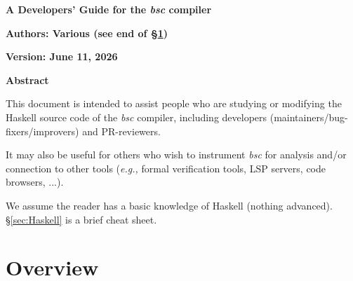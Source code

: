 \documentclass[11pt]{article}
\newcommand{\hdivider}{\noindent\mbox{}\hrulefill\mbox{}}
\newcommand{\eg}{\emph{e.g.,}}
\newcommand{\BSC}{{\it{}bsc}}
\begin{document}

\begin{center}
{\Large\bf A Developers' Guide for the {\BSC} compiler}

{\Large\bf Authors: Various \footnotesize{(see end of \S\ref{sec:overview})}}

{\bf Version: June 11, 2026}

\vspace*{5ex}

{\bf Abstract}

\begin{minipage}{0.8\textwidth}

This document is intended to assist people who are studying or
modifying the Haskell source code of the {\BSC} compiler, including
developers (maintainers/bug-fixers/improvers) and PR-reviewers.

\vspace*{1ex}

It may also be useful for others who wish to instrument {\BSC} for
analysis and/or connection to other tools ({\eg} formal verification
tools, LSP servers, code browsers, ...).

\vspace*{1ex}

We assume the reader has a basic knowledge of Haskell (nothing
advanced). \S\ref{sec:Haskell} is a brief cheat sheet.

\end{minipage}

\end{center}


\hdivider

\label{sec:longtoc}

\tableofcontents

%
%

\hdivider


\section{Overview}

\label{sec:overview}
\end{document}
